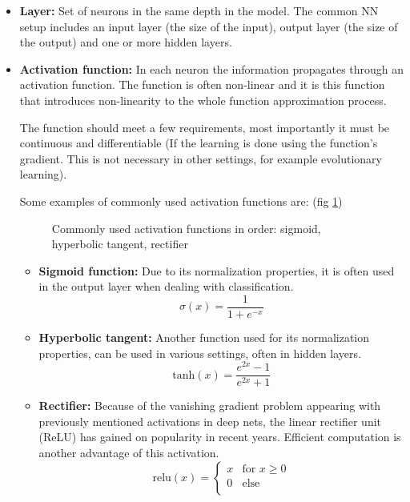 \begin{itemize}
\item \textbf{Layer:} Set of neurons in the same depth in the model. The common NN setup includes an input layer (the size of the input), output layer (the size of the output) and one or more hidden layers.

\item \textbf{Activation function:} In each neuron the information propagates through an activation function. The function is often non-linear and it is this function that introduces non-linearity to the whole function approximation process.

The function should meet a few requirements, most importantly it must be continuous and differentiable (If the learning is done using the function's gradient. This is not necessary in other settings, for example evolutionary learning).

Some examples of commonly used activation functions are: (fig \ref{plot:activations})
\begin{figure}[htbp]

\caption{Commonly used activation functions in order: sigmoid, hyperbolic tangent, rectifier}
\centering
\label{plot:activations}
\end{figure}
\begin{itemize}
\item \textbf{Sigmoid function:} Due to its normalization properties, it is often used in the output layer when dealing with classification.
$$\sigma(x)=\dfrac{1}{1+e^{-x}}$$
\item \textbf{Hyperbolic tangent:} Another function used for its normalization properties, can be used in various settings, often in hidden layers.
$$\text{tanh}(x)=\dfrac{e^{2x}-1}{e^{2x}+1}$$
\item \textbf{Rectifier:} Because of the vanishing gradient problem appearing with previously mentioned activations in deep nets, the linear rectifier unit (ReLU) has gained on popularity in recent years. Efficient computation is another advantage of this activation.
$$\text{relu}(x)=\begin{cases}
            x & \text {for } x \geq 0 \\
            0 & \text{else}\\
            \end{cases} $$
\end{itemize}

\end{itemize}


